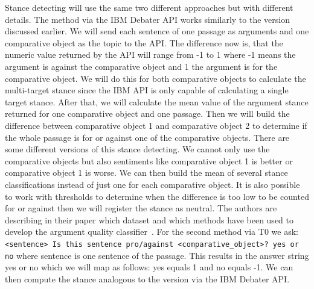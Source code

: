         Stance detecting will use the same two different approaches but with different details. The method via the IBM Debater API works similarly to the version discussed earlier. We will send each sentence of one passage as arguments and one comparative object as the topic to the API. The difference now is, that the numeric value returned by the API will range from -1 to 1 where -1 means the argument is against the comparative object and 1 the argument is for the comparative object. We will do this for both comparative objects to calculate the multi-target stance since the IBM API is only capable of calculating a single target stance. After that, we will calculate the mean value of the argument stance returned for one comparative object and one passage. Then we will build the difference between comparative object 1 and comparative object 2 to determine if the whole passage is for or against one of the comparative objects. There are some different versions of this stance detecting. We cannot only use the comparative objects but also sentiments like comparative object 1 is better or comparative object 1 is worse. We can then build the mean of several stance classifications instead of just one for each comparative object. It is also possible to work with thresholds to determine when the difference is too low to be counted for or against then we will register the stance as neutral.  The authors \citeauthor{BarHaimBDSS2017} are describing in their paper which dataset and which methods have been used to develop the argument quality classifier~\cite{BarHaimBDSS2017}. For the second method via T0 we ask: \texttt{<sentence> Is this sentence pro/against <comparative\_object>? yes or no} where sentence is one sentence of the passage. This results in the answer string yes or no which we will map as follows: yes equals 1 and no equals -1. We can then compute the stance analogous to the version via the IBM Debater API.
